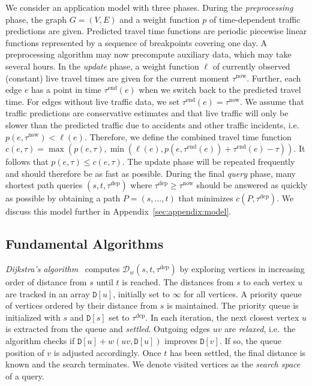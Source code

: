 \documentclass[a4paper,UKenglish,cleveref, autoref, thm-restate,anonymous]{lipics-v2021}
\newcommand*{\pred}{p}
\newcommand*{\comb}{c}
\newcommand*{\dist}{\mathcal{D}}
\newcommand*{\live}{\ell}
\newcommand*{\tdep}{\tau^{\operatorname{dep}}}
\newcommand*{\tend}{\tau^{\operatorname{end}}}
\newcommand*{\tnow}{\tau^{\operatorname{now}}}
\begin{document}
We consider an application model with three phases.
During the \emph{preprocessing} phase, the graph $G=(V,E)$ and a weight function $\pred$ of time-dependent traffic predictions are given.
Predicted travel time functions are periodic piecewise linear functions represented by a sequence of breakpoints covering one day.
A preprocessing algorithm may now precompute auxiliary data, which may take several hours.
In the \emph{update} phase, a weight function $\live$ of currently observed (constant) live travel times are given for the current moment $\tnow$.
Further, each edge $e$ has a point in time $\tend(e)$ when we switch back to the predicted travel time.
For edges without live traffic data, we set $\tend(e) = \tnow$.
We assume that traffic predictions are conservative estimates and that live traffic will only be slower than the predicted traffic due to accidents and other traffic incidents, i.e.\ $\pred(e, \tnow) < \live(e)$.
Therefore, we define the combined travel time function $\comb(e, \tau) = \max(\pred(e, \tau), \min(\live(e), \pred(e, \tend(e)) + \tend(e) - \tau))$.
It follows that $\pred(e, \tau) \leq \comb(e, \tau)$.
The update phase will be repeated frequently and should therefore be as fast as possible.
During the final \emph{query} phase, many shortest path queries $(s,t,\tdep)$ where $\tdep \geq \tnow$ should be answered as quickly as possible by obtaining a path $P = (s,\dots,t)$ that minimizes $\comb(P, \tdep)$.
We discuss this model further in Appendix~\ref{sec:appendix:model}.

\subsection{Fundamental Algorithms}

\emph{Dijkstra's algorithm}~\cite{d-ntpcg-59} computes $\dist_w(s,t,\tdep)$ by exploring vertices in increasing order of distance from $s$ until $t$ is reached.
The distances from $s$ to each vertex $u$ are tracked in an array $\mathtt{D}[u]$, initially set to $\infty$ for all vertices.
A priority queue of vertices ordered by their distance from $s$ is maintained.
The priority queue is initialized with $s$ and $\mathtt{D}[s]$ set to $\tdep$.
In each iteration, the next closest vertex $u$ is extracted from the queue and \emph{settled}.
Outgoing edges $uv$ are \emph{relaxed}, i.e.\ the algorithm checks if $\mathtt{D}[u] + w(uv, \mathtt{D}[u])$ improves $\mathtt{D}[v]$.
If so, the queue position of $v$ is adjusted accordingly.
Once $t$ has been settled, the final distance is known and the search terminates.
We denote visited vertices as the \emph{search space} of a query.
\end{document}
